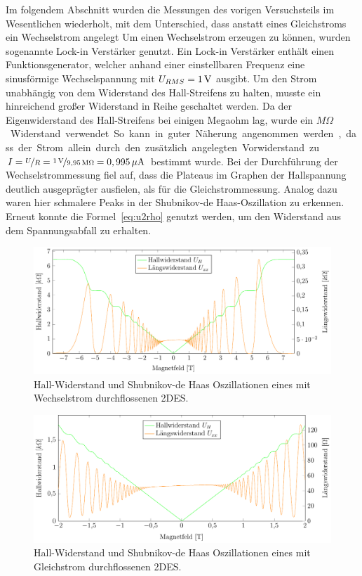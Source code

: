 
Im folgendem Abschnitt wurden die Messungen des vorigen Versuchsteils im Wesentlichen wiederholt, mit dem Unterschied, dass anstatt eines Gleichstroms ein Wechselstrom angelegt %
 Um einen Wechselstrom erzeugen zu können, wurden sogenannte Lock-in Verstärker genutzt. Ein Lock-in Verstärker enthält einen Funktionsgenerator, welcher anhand einer einstellbaren Frequenz eine sinusförmige Wechselspannung mit $U_{RMS}=\unit[1]{V}$ ausgibt. Um den Strom unabhängig von dem Widerstand des Hall-Streifens zu halten, musste ein hinreichend großer Widerstand in Reihe geschaltet werden. Da der Eigenwiderstand des Hall-Streifens bei einigen Megaohm lag, wurde ein  \unit[9,95]{$M\Omega$} Widerstand verwendet. So kann in guter Näherung angenommen werden, dass der Strom allein durch den zusätzlich angelegten Vorwiderstand zu $I=\nicefrac{U}{R}=\nicefrac{\unit[1]{V}}{\unit[9,95]{M\Omega}}=\unit[0,995]{\mu A}$ bestimmt wurde. 
 Bei der Durchführung der Wechselstrommessung fiel auf, dass die Plateaus im Graphen der Hallspannung %
 deutlich ausgeprägter ausfielen, als für die Gleichstrommessung. Analog dazu waren hier schmalere Peaks in der Shubnikov-de Haas-Oszillation zu erkennen.  
 Erneut konnte die Formel~\eqref{eq:u2rho} genutzt werden, um den Widerstand aus dem Spannungsabfall zu erhalten. %

\begin{figure}[h]
	\centering
	\includegraphics{graphs/ac/full_range.pdf}
	\caption[Wechselstrommessung im maximalen Magnetfeldbereich]{
		Hall-Widerstand und Shubnikov-de Haas Oszillationen eines mit Wechselstrom durchflossenen 2DES.
	}
	\label{fig:full_range_ac}
\end{figure}


\begin{figure}[h]
	\centering
	\includegraphics{graphs/ac/pm2T_range.pdf}
	\caption[Höher aufgelöste Gleichstrommessung in Magnetfeldteilbereich]{
		Hall-Widerstand und Shubnikov-de Haas Oszillationen eines mit Gleichstrom durchflossenen 2DES.
	}
	\label{fig:2T_range_ac}
\end{figure}


